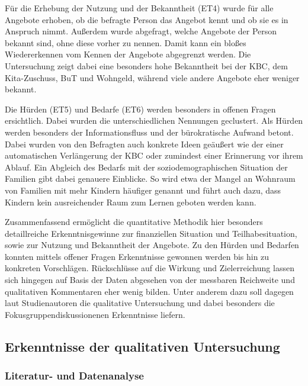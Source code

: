 Für die Erhebung der Nutzung und der Bekanntheit (ET4) wurde für alle Angebote erhoben, ob die befragte Person das Angebot kennt und ob sie es in Anspruch nimmt. Außerdem wurde abgefragt, welche Angebote der Person bekannt sind, ohne diese vorher zu nennen. Damit kann ein bloßes Wiedererkennen vom Kennen der Angebote abgegrenzt werden. Die Untersuchung zeigt dabei eine besonders hohe Bekanntheit bei der KBC, dem Kita-Zuschuss, BuT und Wohngeld, während viele andere Angebote eher weniger bekannt.

Die Hürden (ET5) und Bedarfe (ET6) werden besonders in offenen Fragen ersichtlich. Dabei wurden die unterschiedlichen Nennungen geclustert. Als Hürden werden besonders der Informationsfluss und der bürokratische Aufwand betont. Dabei wurden von den Befragten auch konkrete Ideen geäußert wie der einer automatischen Verlängerung der KBC oder zumindest einer Erinnerung vor ihrem Ablauf. Ein Abgleich des Bedarfs mit der soziodemographischen Situation der Familien gibt dabei genauere Einblicke. So wird etwa der Mangel an Wohnraum von Familien mit mehr Kindern häufiger genannt und führt auch dazu, dass Kindern kein ausreichender Raum zum Lernen geboten werden kann.

Zusammenfassend ermöglicht die quantitative Methodik hier besonders detaillreiche Erkenntnisgewinne zur finanziellen Situation und Teilhabesituation, sowie zur Nutzung und Bekanntheit der Angebote. Zu den Hürden und Bedarfen konnten mittels offener Fragen Erkenntnisse gewonnen werden bis hin zu konkreten Vorschlägen. Rückschlüsse auf die Wirkung und Zielerreichung lassen sich hingegen auf Basis der Daten abgesehen von der messbaren Reichweite und qualitativen Kommentaren eher wenig bilden. Unter anderem dazu soll dagegen laut Studienautoren die qualitative Untersuchung und dabei besonders die Fokusgruppendiskussionenen Erkenntnisse liefern.

\subsection{Erkenntnisse der qualitativen Untersuchung}

\subsubsection{Literatur- und Datenanalyse}

